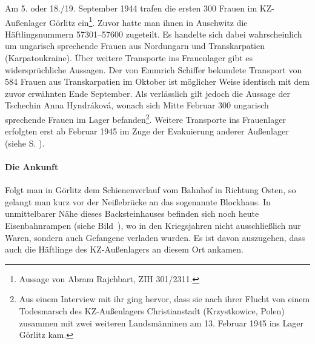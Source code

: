 Am 5. oder 18./19. September 1944 trafen die ersten 300 Frauen im KZ-Außenlager Görlitz ein\footnote{Aussage von Abram Rajchbart, ZIH 301/2311.}. Zuvor hatte man ihnen in Auschwitz die Häftlingsnummern 57301--57600 zugeteilt. Es handelte sich dabei wahrscheinlich um ungarisch sprechende Frauen aus Nordungarn und Transkarpatien (Karpatoukraine).
Über weitere Transporte ins Frauenlager gibt es widersprüchliche Aussagen. Der von Emmrich Schiffer bekundete Transport von 584 Frauen aus Transkarpatien im Oktober ist möglicher Weise identisch mit dem zuvor erwähnten Ende September. Als verlässlich gilt jedoch die Aussage der Tschechin Anna Hyndr\'akov\'a, wonach sich Mitte Februar 300 ungarisch sprechende Frauen im Lager befanden\footnote{Aus einem Interview mit ihr ging hervor, dass sie nach ihrer Flucht von einem Todesmarsch des KZ-Außenlagers Christianstadt (Krzystkowice, Polen) zusammen mit zwei weiteren Landsmänninen am 13. Februar 1945 ins Lager Görlitz kam.}.\newline
Weitere Transporte ins Frauenlager erfolgten erst ab Februar 1945 im Zuge der Evakuierung anderer Außenlager (siehe S. \pageref{eva_2}).

\paragraph{Die Ankunft}
Folgt man in Görlitz dem Schienenverlauf vom Bahnhof in Richtung Osten, so gelangt man kurz vor der Neißebrücke an das sogenannte Blockhaus. In unmittelbarer Nähe dieses Backsteinhauses befinden sich noch heute Eisenbahnrampen (siehe Bild~), wo in den Kriegsjahren nicht ausschließlich nur Waren, sondern auch Gefangene verladen wurden. Es ist davon auszugehen, dass auch die Häftlinge des KZ-Außenlagers an diesem Ort ankamen.%

